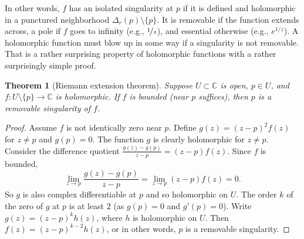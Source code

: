 \documentclass[12pt,openany]{book}
\newcommand{\C}{{\mathbb{C}}}
\newcommand{\myindex}[1]{#1\index{#1}}
\theoremstyle{plain}
\newtheorem{thm}{Theorem}[section]
\theoremstyle{remark}
\theoremstyle{definition}
\theoremstyle{exercise}
\theoremstyle{example}
\begin{document}
In other words, $f$ has an isolated singularity at $p$ if it is defined
and holomorphic in a punctured neighborhood
$\Delta_r(p) \setminus \{ p \}$.  It is removable if the function extends
across, a pole if $f$ goes to infinity (e.g., $\nicefrac{1}{z}$),
and essential otherwise (e.g., $e^{1/z}$).
A holomorphic function must blow up in some way if a singularity is not
removable.  That is a rather surprising property of holomorphic functions
with a rather surprisingly simple proof.

\begin{thm}[\myindex{Riemann extension theorem}]
\label{thm:riemannext}
Suppose $U \subset \C$ is open, $p \in U$,
and $f \colon U \setminus \{p\} \to \C$ is holomorphic.
If $f$ is bounded (near $p$ suffices), then $p$ is a removable singularity
of $f$.
\end{thm}

\begin{proof}
Assume $f$ is not identically zero near $p$.
Define
$g(z) = {(z-p)}^2 f(z)$ for $z \neq p$ and $g(p) = 0$.
The function $g$ is clearly holomorphic for $z \neq p$.  Consider the 
difference quotient
$\frac{g(z)-g(p)}{z-p} = (z-p) f(z)$.
Since $f$ is bounded,
\begin{equation*}
\lim_{z\to p} \frac{g(z)-g(p)}{z-p} = \lim_{z\to p} (z-p) f(z) = 0 .
\end{equation*}
So $g$ is also complex differentiable at $p$ and so holomorphic on $U$.
The order $k$ of the zero of $g$ at $p$ is at least $2$ (as $g(p)=0$ and
$g'(p)=0$).  Write
$g(z) = {(z-p)}^k h(z)$, where $h$ is holomorphic on $U$.
Then $f(z) = {(z-p)}^{k-2}h(z)$, or in other words, $p$ is a removable 
singularity.
\end{proof}
\end{document}
